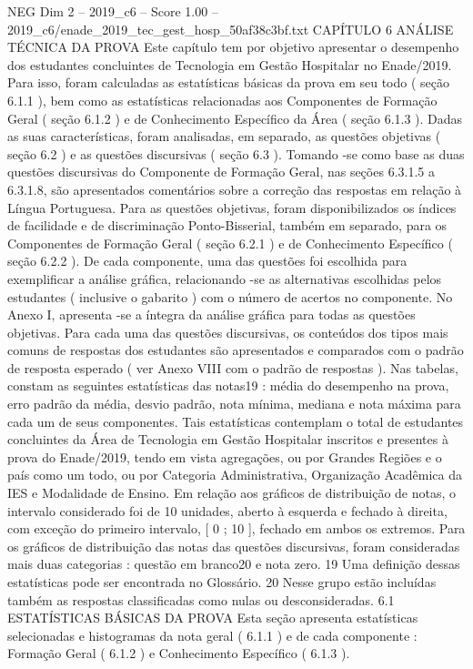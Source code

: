 \begin{textsample}{NEG Dim 2 – 2019\_c6 – Score 1.00 – 2019\_c6/enade\_2019\_tec\_gest\_hosp\_50af38c3bf.txt}  \label{ex:f2_neg_278}
CAPÍTULO 6 ANÁLISE TÉCNICA DA PROVA Este capítulo tem por objetivo apresentar o desempenho dos estudantes concluintes de Tecnologia em Gestão Hospitalar no Enade/2019.
Para isso, foram calculadas as estatísticas básicas da prova em seu todo ( seção 6.1.1 ), bem como as estatísticas relacionadas aos Componentes de Formação Geral ( seção 6.1.2 ) e de Conhecimento Específico da Área ( seção 6.1.3 ).
Dadas as suas características, foram analisadas, em separado, as questões objetivas ( seção 6.2 ) e as questões discursivas ( seção 6.3 ).
Tomando -se como base as duas questões discursivas do Componente de Formação Geral, nas seções 6.3.1.5 a 6.3.1.8, são apresentados comentários sobre a correção das respostas em relação à Língua Portuguesa.
Para as questões objetivas, foram disponibilizados os índices de facilidade e de discriminação Ponto-Bisserial, também em separado, para os Componentes de Formação Geral ( seção 6.2.1 ) e de Conhecimento Específico ( seção 6.2.2 ).
De cada componente, uma das questões foi escolhida para exemplificar a análise gráfica, relacionando -se as alternativas escolhidas pelos estudantes ( inclusive o gabarito ) com o número de acertos no componente.
No Anexo I, apresenta -se a íntegra da análise gráfica para todas as questões objetivas.
Para cada uma das questões discursivas, os conteúdos dos tipos mais comuns de respostas dos estudantes são apresentados e comparados com o padrão de resposta esperado ( ver Anexo VIII com o padrão de respostas ).
Nas tabelas, constam as seguintes estatísticas das notas19 : média do desempenho na prova, erro padrão da média, desvio padrão, nota mínima, mediana e nota máxima para cada um de seus componentes.
Tais estatísticas contemplam o total de estudantes concluintes da Área de Tecnologia em Gestão Hospitalar inscritos e presentes à prova do Enade/2019, tendo em vista agregações, ou por Grandes Regiões e o país como um todo, ou por Categoria Administrativa, Organização Acadêmica da IES e Modalidade de Ensino.
Em relação aos gráficos de distribuição de notas, o intervalo considerado foi de 10 unidades, aberto à esquerda e fechado à direita, com exceção do primeiro intervalo, [ 0 ; 10 ], fechado em ambos os extremos.
Para os gráficos de distribuição das notas das questões discursivas, foram consideradas mais duas categorias : questão em branco20 e nota zero. 19 Uma definição dessas estatísticas pode ser encontrada no Glossário. 20 Nesse grupo estão incluídas também as respostas classificadas como nulas ou desconsideradas. 6.1 ESTATÍSTICAS BÁSICAS DA PROVA Esta seção apresenta estatísticas selecionadas e histogramas da nota geral ( 6.1.1 ) e de cada componente : Formação Geral ( 6.1.2 ) e Conhecimento Específico ( 6.1.3 ).

\end{textsample}
